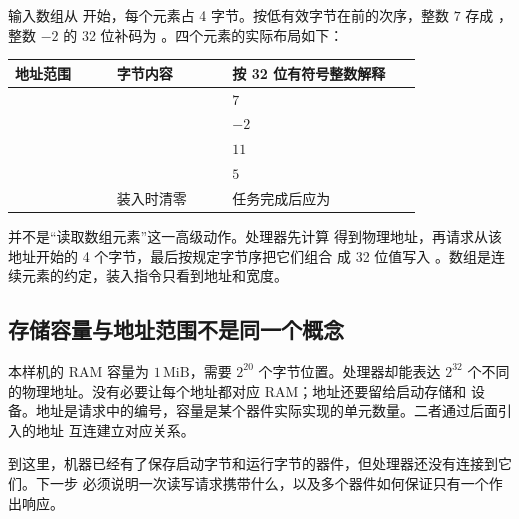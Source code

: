 输入数组从  开始，每个元素占 4 字节。按低有效字节在前的次序，整数
\(7\) 存成 ，整数 \(-2\) 的 32 位补码为
。四个元素的实际布局如下：

\begin{longtable}{|L{0.22\linewidth}|L{0.25\linewidth}|L{0.41\linewidth}|}
\hline
{}
地址范围 & 字节内容 & 按 32 位有符号整数解释 \\ \hline
{} &  & \(7\) \\ \hline
{} &  & \(-2\) \\ \hline
{} &  & \(11\) \\ \hline
{} &  & \(5\) \\ \hline
{} & 装入时清零 & 任务完成后应为  \\ \hline
\end{longtable}

 并不是“读取数组元素”这一高级动作。处理器先计算
 得到物理地址，再请求从该地址开始的 4 个字节，最后按规定字节序把它们组合
成 32 位值写入 。数组是连续元素的约定，装入指令只看到地址和宽度。

\subsection{存储容量与地址范围不是同一个概念}

本样机的 RAM 容量为 \(1\,\mathrm{MiB}\)，需要 \(2^{20}\) 个字节位置。处理器却能表达
\(2^{32}\) 个不同的物理地址。没有必要让每个地址都对应 RAM；地址还要留给启动存储和
设备。地址是请求中的编号，容量是某个器件实际实现的单元数量。二者通过后面引入的地址
互连建立对应关系。

到这里，机器已经有了保存启动字节和运行字节的器件，但处理器还没有连接到它们。下一步
必须说明一次读写请求携带什么，以及多个器件如何保证只有一个作出响应。

